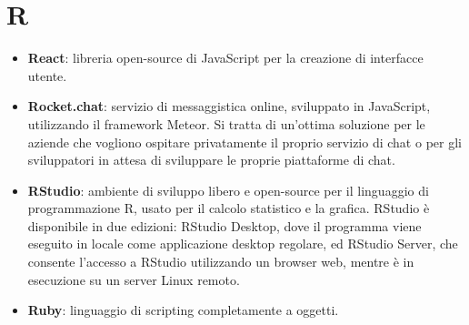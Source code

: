 \section{R}
\begin{itemize}
	\item \textbf{React}: libreria open-source di JavaScript per la creazione di interfacce utente.
	\item \textbf{Rocket.chat}: servizio di messaggistica online, sviluppato in JavaScript, utilizzando il framework Meteor. Si tratta di un'ottima soluzione per le aziende che vogliono ospitare privatamente il proprio servizio di chat o per gli sviluppatori in attesa di sviluppare le proprie piattaforme di chat.
	\item \textbf{RStudio}: ambiente di sviluppo libero e open-source per il linguaggio di programmazione R, usato per il calcolo statistico e la grafica. RStudio è disponibile in due edizioni: RStudio Desktop, dove il programma viene eseguito in locale come applicazione desktop regolare, ed RStudio Server, che consente l'accesso a RStudio utilizzando un browser web, mentre è in esecuzione su un server Linux remoto.
	\item \textbf{Ruby}: linguaggio di scripting completamente a oggetti.
\end{itemize}